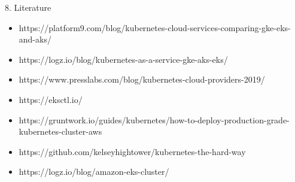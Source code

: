 \documentclass{beamer}
\begin{document}
\begin{frame}{8. Literature}%
	\tiny{
\begin{itemize}
\item https://platform9.com/blog/kubernetes-cloud-services-comparing-gke-eks-and-aks/
\item https://logz.io/blog/kubernetes-as-a-service-gke-aks-eks/
\item https://www.presslabs.com/blog/kubernetes-cloud-providers-2019/
\item https://eksctl.io/
\item https://gruntwork.io/guides/kubernetes/how-to-deploy-production-grade-kubernetes-cluster-aws
\item https://github.com/kelseyhightower/kubernetes-the-hard-way
\item https://logz.io/blog/amazon-eks-cluster/
\end{itemize}
	}
\end{frame}
\end{document}
